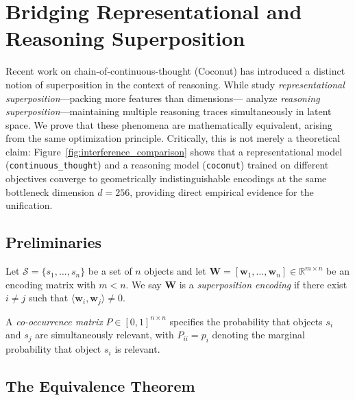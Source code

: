 \section{Bridging Representational and Reasoning Superposition}
\label{sec:bridging}

Recent work on chain-of-continuous-thought (Coconut) \citep{hao2024training} has introduced a distinct notion of superposition in the context of reasoning. While \citet{elhage2022toy} study \emph{representational superposition}---packing more features than dimensions---\citet{zhu2025reasoning} analyze \emph{reasoning superposition}---maintaining multiple reasoning traces simultaneously in latent space. We prove that these phenomena are mathematically equivalent, arising from the same optimization principle. Critically, this is not merely a theoretical claim: Figure~\ref{fig:interference_comparison} shows that a representational model (\texttt{continuous\_thought}) and a reasoning model (\texttt{coconut}) trained on different objectives converge to geometrically indistinguishable encodings at the same bottleneck dimension $d=256$, providing direct empirical evidence for the unification.

\subsection{Preliminaries}

\begin{definition}
Let $\mathcal{S} = \{s_1, \ldots, s_n\}$ be a set of $n$ objects and let $\mathbf{W} = [\mathbf{w}_1, \ldots, \mathbf{w}_n] \in \mathbb{R}^{m \times n}$ be an encoding matrix with $m < n$. We say $\mathbf{W}$ is a \emph{superposition encoding} if there exist $i \neq j$ such that $\langle \mathbf{w}_i, \mathbf{w}_j \rangle \neq 0$.
\end{definition}

\begin{definition}
A \emph{co-occurrence matrix} $P \in [0,1]^{n \times n}$ specifies the probability that objects $s_i$ and $s_j$ are simultaneously relevant, with $P_{ii} = p_i$ denoting the marginal probability that object $s_i$ is relevant.
\end{definition}

\subsection{The Equivalence Theorem}

